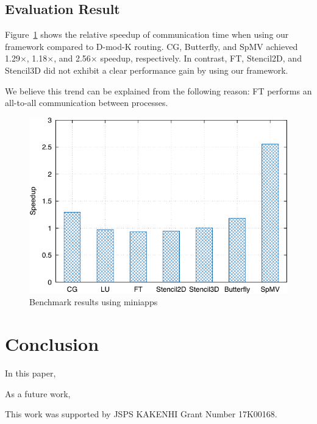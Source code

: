 \documentclass[graybox]{svmult}
\begin{document}
\subsection{Evaluation Result}

Figure~\ref{kt:fig:benchmark} shows the relative speedup of communication time
when using our framework compared to D-mod-K routing. CG, Butterfly, and SpMV
achieved 1.29$\times$, 1.18$\times$, and 2.56$\times$ speedup, respectively.
In contrast, FT, Stencil2D, and Stencil3D did not exhibit a clear performance
gain by using our framework.

We believe this trend can be explained from the following reason: FT performs
an all-to-all communication between processes.

\begin{figure}
    \centering
    \includegraphics{benchmark_result}
    \caption{Benchmark results using miniapps}%
    \label{kt:fig:benchmark}
\end{figure}

\section{Conclusion}\label{kt:sec:v}

In this paper,

As a future work,

\begin{acknowledgement}
This work was supported by JSPS KAKENHI Grant Number 17K00168.
\end{acknowledgement}



\end{document}
